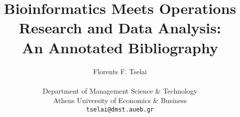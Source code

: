 \documentclass[12pt]{article}
\begin{document}
\title
{Bioinformatics Meets Operations Research and Data Analysis:
\\An Annotated Bibliography}

\author{
	Florents F. Tselai\\
	\\
	Department of Management Science \& Technology\\
	Athens University of Economics \& Business\\
	\texttt{tselai@dmst.aueb.gr}
}
\date{}
\maketitle

   
\nocite{*}



\end{document}
